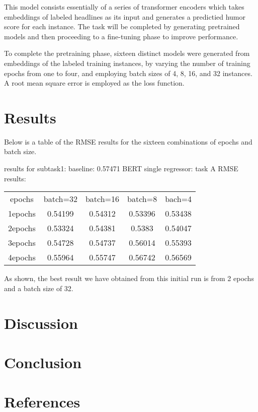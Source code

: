 \documentclass{article}
\begin{document}
This model consists essentially of a series of transformer encoders which takes embeddings of labeled headlines as its input and generates a predictied humor score for each instance. The task will be completed by generating pretrained models and then proceeding to a fine-tuning phase to improve performance.

To complete the pretraining phase, sixteen distinct models were generated from embeddings of the labeled training instances, by varying the number of training epochs from one to four, and employing batch sizes of 4, 8, 16, and 32 instances. A root mean square error is employed as the loss function.

\section{Results}

Below is a table of the RMSE results for the sixteen combinations of epochs and batch size.

results for subtask1:
baseline: 0.57471
BERT single regressor:
task A RMSE results:
\begin{center}
\begin{tabular}{|c|c|c|c|c|}
\hline
epochs & batch=32 & batch=16 & batch=8 & bach=4 \\
1epochs & 0.54199 & 0.54312 & 0.53396 & 0.53438 \\
2epochs & 0.53324 & 0.54381 & 0.5383 & 0.54047 \\
3epochs & 0.54728 & 0.54737 & 0.56014 & 0.55393 \\
4epochs & 0.55964 & 0.55747 & 0.56742 & 0.56569 \\
\hline
\end{tabular}
\end{center}

As shown, the best result we have obtained from this initial run is from 2 epochs and a batch size of 32.

\section{Discussion}

\section{Conclusion}

\section{References}



\end{document}
